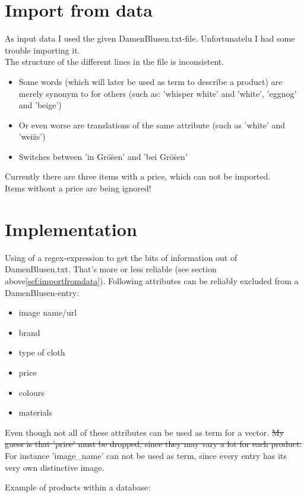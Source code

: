 

\section{Import from data}
\label{sec:importfromdata}
As input data I used the given DamenBlusen.txt-file.
Unfortunatelu I had some trouble importing it.\\
The structure of the different lines in the file is inconsistent.
\begin{itemize}
    \item Some words (which will later be used as term to describe a product) are merely synonym to for others (such as: 'whisper white' and 'white', 'eggnog' and 'beige')
    \item Or even worse are translations of the same attribute (such as 'white' and 'wei\"zs')
    \item Switches between 'in Gr\"o\"sen' and 'bei Gr\"o\"sen'
\end{itemize}
Currently there are three items with a price, which can not be imported.\\
Items without a price are being ignored!


\section{Implementation}
Using of a regex-expression to get the bits of information out of DamenBlusen.txt.
That's more or less reliable (see section above\ref{sef:importfromdata}).
Following attributes can be reliably excluded from a DamenBlusen-entry:
\begin{itemize}
    \item image name/url
    \item brand
    \item type of cloth
    \item price
    \item colours
    \item materials
\end{itemize}

\medskip
Even though not all of these attributes can be used as term for a vector.
\sout{My guess is that 'price' must be dropped, since they may vary a lot for each product.}
For instance 'image\_name' can not be used as term, since every entry has its very own distinctive image.

\bigskip
\noindent
Example of products within a database:\\

